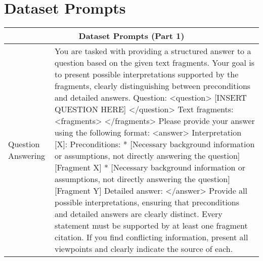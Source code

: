 \section{Dataset Prompts}
\label{appendix_labelc}
\begin{tabular}{l p{}}
\hline
\multicolumn{2}{c}{\textbf{Dataset Prompts (Part 1)}} \\
\hline
Question Answering & You are tasked with providing a structured answer to a question based on the given text fragments. Your goal is to present possible interpretations supported by the fragments, clearly distinguishing between preconditions and detailed answers. \newline
Question: <question> [INSERT QUESTION HERE] </question> \newline
Text fragments: \newline
<fragments>  \newline
</fragments> \newline
Please provide your answer using the following format: \newline
<answer>  \newline
Interpretation [X]: \newline
Preconditions: \newline
* [Necessary background information or assumptions, not directly answering the question] [Fragment X] \newline
* [Necessary background information or assumptions, not directly answering the question] [Fragment Y] \newline
Detailed answer:    \newline
</answer> \newline
Provide all possible interpretations, ensuring that preconditions and detailed answers are clearly distinct. Every statement must be supported by at least one fragment citation. If you find conflicting information, present all viewpoints and clearly indicate the source of each. \\


\end{tabular}
